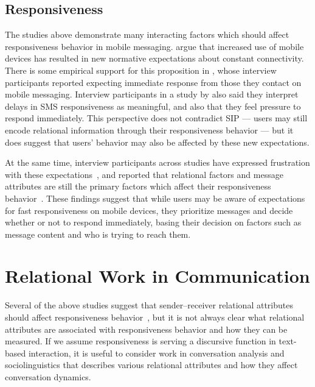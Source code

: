 \documentclass[12pt]{nuthesis}	%
\begin{document}
\subsection{Responsiveness}

The studies above demonstrate many interacting factors which should affect responsiveness behavior in mobile messaging. \citet{bayer2015connection} argue that increased use of mobile devices has resulted in new normative expectations about constant connectivity. There is some empirical support for this proposition in \citet{church2013s}, whose interview participants reported expecting immediate response from those they contact on mobile messaging. Interview participants in a study by \citet{rettie2009mobile} also said they interpret delays in SMS responsiveness as meaningful, and also that they feel pressure to respond immediately. This perspective does not contradict SIP --- users may still encode relational information through their responsiveness behavior --- but it does suggest that users' behavior may also be affected by these new expectations.

At the same time, interview participants across studies have expressed frustration with these expectations~\citep{ames2013managing}, and reported that relational factors and message attributes are still the primary factors which affect their responsiveness behavior~\citep{grandhi2010technology,wohn2015ambient}. These findings suggest that while users may be aware of expectations for fast responsiveness on mobile devices, they prioritize messages and decide whether or not to respond immediately, basing their decision on factors such as message content and who is trying to reach them.

\section{Relational Work in Communication}

Several of the above studies suggest that sender--receiver relational attributes should affect responsiveness behavior~\citep[e.g.,][]{grandhi2010technology,kalman2006pauses,walther1995nonverbal,wohn2015ambient}, but it is not always clear what relational attributes are associated with responsiveness behavior and how they can be measured. If we assume responsiveness is serving a discursive function in text-based interaction, it is useful to consider work in conversation analysis and sociolinguistics that describes various relational attributes and how they affect conversation dynamics.
\end{document}
